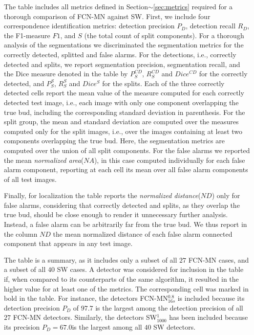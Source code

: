 \documentclass[a4paper,authoryear,review]{elsarticle}
\begin{document}
	The table includes all metrics defined in Section$\sim$\ref{sec:metrics} required for a thorough comparison of FCN-MN against SW. First, we include four correspondence identification metrics: detection precision $P_D$, detection recall $R_D$, the F1-measure  $F1$, and $S$ (the total count of split components). 
	For a thorough analysis of the segmentations we discriminated the segmentation metrics for the correctly detected, splitted and false alarms. For the detections, i.e., correctly detected and splits, we report segmentation precision,  segmentation recall, and the Dice measure denoted in the table by $P_S^{CD}$, $R_S^{CD}$ and $Dice^{CD}$ for the correctly detected, and $P_S^S$, $R_S^S$ and $Dice^S$ for the splits.  Each of the three correctly detected cells report the mean value of the measure computed for each correctly detected test image, i.e., each image with only one component overlapping the true bud, including the corresponding standard deviation  in parenthesis. For the split group, the mean and standard deviation are computed over the measures computed only for the split images, i.e., over the images containing at least two components overlapping the true bud. Here, the segmentation metrics are computed over the union of all split components. 
	For the false alarms we reported the mean \emph{normalized area}($NA$), in this case computed individually for each false alarm component, reporting at each cell its mean over all false alarm components of all test images. 
	
	Finally, for localization the table reports the \emph{normalized distance}($ND$) only for false alarms, considering that correctly detected and splits, as they overlap the true bud, should be close enough to render it unnecessary further analysis. Instead, a false alarm can be arbitrarily far from the true bud.  We thus report in the column $ND$ the mean normalized distance of each false alarm connected component that appears in any test image.
	
	The table is a summary, as it includes only a subset of all $27$ FCN-MN cases, and a subset of all $40$ SW cases. A detector was considered for inclusion in the table if, when compared to its counterparts of the same algorithm, it resulted in the higher value for at least one of the metrics. The corresponding cell was marked in bold in the table. For instance, the detectors FCN-MN$_{16s}^{0.8}$ is included because its detection precision $P_D$ of $97.7$ is the largest among the detection precision of all $27$ FCN-MN detectors. Similarly, the detectors SW$_{1000}^1$ has been included because its precision $P_D = 67.0$is the largest among all $40$ SW detectors. 
	
\end{document}

